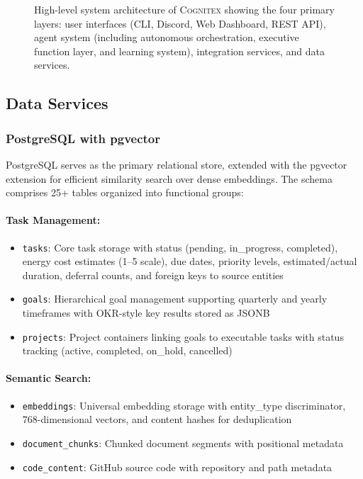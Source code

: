 \documentclass[11pt,a4paper]{article}
\newcommand{\cognitex}{\textsc{Cognitex}}
\begin{document}
\begin{figure}[t]
\caption{High-level system architecture of \cognitex{} showing the four primary layers: user interfaces (CLI, Discord, Web Dashboard, REST API), agent system (including autonomous orchestration, executive function layer, and learning system), integration services, and data services.}
\label{fig:architecture}
\end{figure}

\subsection{Data Services}

\subsubsection{PostgreSQL with pgvector}

PostgreSQL serves as the primary relational store, extended with the pgvector extension for efficient similarity search over dense embeddings. The schema comprises 25+ tables organized into functional groups:

\paragraph{Task Management:}
\begin{itemize}
    \item \texttt{tasks}: Core task storage with status (pending, in\_progress, completed), energy cost estimates (1--5 scale), due dates, priority levels, estimated/actual duration, deferral counts, and foreign keys to source entities
    \item \texttt{goals}: Hierarchical goal management supporting quarterly and yearly timeframes with OKR-style key results stored as JSONB
    \item \texttt{projects}: Project containers linking goals to executable tasks with status tracking (active, completed, on\_hold, cancelled)
\end{itemize}

\paragraph{Semantic Search:}
\begin{itemize}
    \item \texttt{embeddings}: Universal embedding storage with entity\_type discriminator, 768-dimensional vectors, and content hashes for deduplication
    \item \texttt{document\_chunks}: Chunked document segments with positional metadata
    \item \texttt{code\_content}: GitHub source code with repository and path metadata
\end{itemize}
\end{document}
